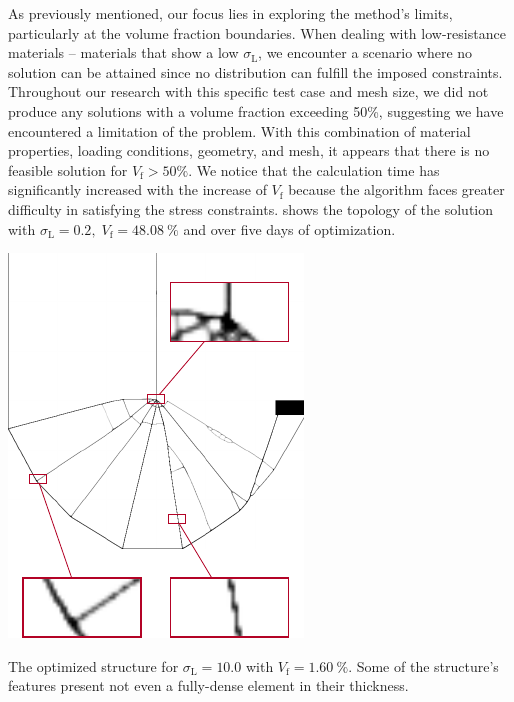 As previously mentioned, our focus lies in exploring the method's limits, particularly at the volume fraction boundaries. When dealing with low-resistance materials -- \ie materials that show a low $\sigma_\text{L}$, we encounter a scenario where no solution can be attained since no distribution can fulfill the imposed constraints. Throughout our research with this specific test case and mesh size, we did not produce any solutions with a volume fraction exceeding 50\%, suggesting we have encountered a limitation of the problem. With this combination of material properties, loading conditions, geometry, and mesh, it appears that there is no feasible solution for $V_\text{f} > 50\%$. We notice that the calculation time has significantly increased with the increase of $V_\text{f}$ because the algorithm faces greater difficulty in satisfying the stress constraints.  shows the topology of the solution with $\sigma_\text{L}=0.2, \; V_\text{f}=\qty{48.08}{\percent}$ and over five days of optimization.
\begin{marginfigure}
    \centering
    \includegraphics[width=0.8\linewidth]{figures/03_comparison_TO_TTO/09_to_zoom/to_zoom.pdf}
    \caption{The optimized structure for $\sigma_\text{L}=10.0$ with $V_\text{f}=\qty{1.60}{\percent}$. Some of the structure's features present not even a fully-dense element in their thickness.}
    \label{fig:03_to_sol_zoom}
\end{marginfigure}

